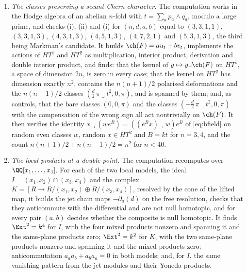 \begin{enumerate}[label=\textup{(\Roman*)},leftmargin=*]
  $\QQ[\Theta]/(\Theta^{5})$ with $\int\Theta^{4}=24$ and checks
   for every odd squarefree $d\le101$: the Euler
  characteristics $14$, $-36$ and $24$ from the Koszul complexes; the count
  $12N(N-5)=(d+9)(3d-3)$ of isolated points and its comparison with the
  number $(d+9)(2d-1)$ of those that are normalised;
  $\chi(\cO_{\widetilde Z})=(d+9)(27-d)$ from the
  Mayer--Vietoris complex; the equality $\ch(\cF)=u_{t}+3v_{t}$ degree by
  degree for the twist $3\Theta$, and the failure by $-4\Theta^{2}$ in
  degree two for the twist $\Theta$; $\Nm(3+\sqrt{-d})=2N$ and the
  discriminant $(d+9)\Theta^{2}$; and the ranks $8d(d-9)$ and $8d(d+9)$ of
  the two transforms, with the threefold control $-8q$ that reproduces
  Markman's rank at $n=3$.
\item \emph{The classes preserving a secant Chern character.} The
  computation works in the Hodge algebra of an abelian $n$-fold with
  $t=\sum_{a}p_{a}\wedge q_{a}$, modulo a large prime,
  and checks (i), (ii) and (i) for
  $(n,d,a,b)$ equal to $(3,3,1,1)$, $(3,3,1,3)$, $(4,3,1,3)$, $(4,5,1,3)$,
  $(4,7,2,1)$ and $(5,3,1,3)$, the third being Markman's candidate. It builds
  $\ch(F)=au_{t}+bv_{t}$, implements the actions of $HT^{1}$ and $HT^{2}$ as
  multiplication, interior product, derivation and double interior product,
  and finds: that the kernel of $y\mapsto y\lrcorner\ch(F)$ on $HT^{1}$, a
  space of dimension $2n$, is zero in every case; that the kernel on $HT^{2}$ has
  dimension exactly $n^{2}$, contains the $n(n+1)/2$ polarised deformations
  and the $n(n-1)/2$ classes $(\tfrac d2\,\pi\lrcorner t^{2},0,\pi)$, and is
  spanned by them; and, as controls, that the bare classes $(0,0,\pi)$ and
  the classes $(-\tfrac d2\,\pi\lrcorner t^{2},0,\pi)$ with the compensation
  of the wrong sign all act nontrivially on $\ch(F)$. It then verifies the
  identity $x\lrcorner(we^{B})=((e^{B}x)\lrcorner w)e^{B}$ of
  \eqref{eq:bfield} on random even classes $w$, random $x\in HT^{2}$ and
  $B=kt$ for $n=3,4$, and the count $n(n+1)/2+n(n-1)/2=n^{2}$ for $n<40$.
\item \emph{The local products at a double point.} The computation recomputes
   over $\QQ[x_{1},\dots,x_{4}]$. For each of the
  two local models, the ideal $I=(x_{1},x_{2})\cap(x_{3},x_{4})$ and the
  complex $K=[R\to R/(x_{1},x_{2})\oplus R/(x_{3},x_{4})]$, resolved by the
  cone of the lifted map, it builds the jet chain maps $-\partial_{a}(d)$ on
  the free resolution, checks that they anticommute with the differential
  and are not null homotopic, and for every pair $(a,b)$ decides whether the
  composite is null homotopic. It finds $\Ext^{2}=k^{4}$ for $I$, with the
  four mixed products nonzero and spanning it and the same-plane products
  zero; $\Ext^{2}=k^{2}$ for $K$, with the two same-plane products nonzero
  and spanning it and the mixed products zero; anticommutation
  $a_{a}a_{b}+a_{b}a_{a}=0$ in both models; and, for $I$, the same vanishing
  pattern from the jet modules and their Yoneda products.


\end{enumerate}
